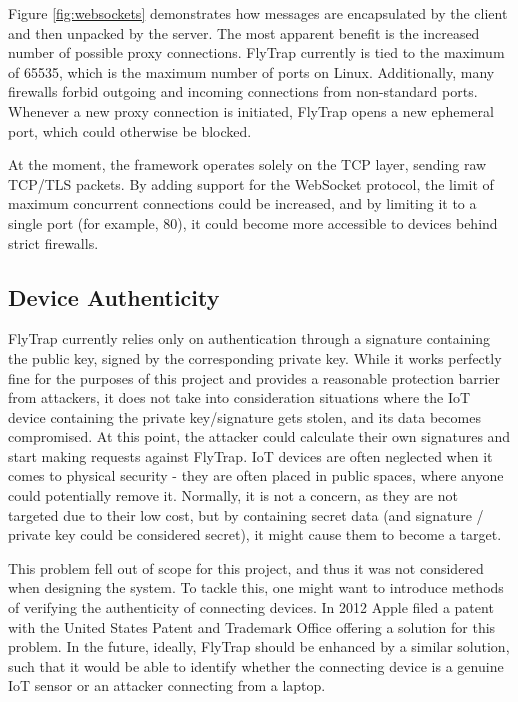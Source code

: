 Figure \ref{fig:websockets} demonstrates how messages are encapsulated by the client and then unpacked by the server. The most apparent benefit is the increased number of possible proxy connections. FlyTrap currently is tied to the maximum of 65535, which is the maximum number of ports on Linux. Additionally, many firewalls forbid outgoing and incoming connections from non-standard ports. Whenever a new proxy connection is initiated, FlyTrap opens a new ephemeral port, which could otherwise be blocked.

At the moment, the framework operates solely on the TCP layer, sending raw TCP/TLS packets. By adding support for the WebSocket protocol, the limit of maximum concurrent connections could be increased, and by limiting it to a single port (for example, 80), it could become more accessible to devices behind strict firewalls.
\subsection{Device Authenticity}
FlyTrap currently relies only on authentication through a signature containing the public key, signed by the corresponding private key. While it works perfectly fine for the purposes of this project and provides a reasonable protection barrier from attackers, it does not take into consideration situations where the IoT device containing the private key/signature gets stolen, and its data becomes compromised. At this point, the attacker could calculate their own signatures and start making requests against FlyTrap. IoT devices are often neglected when it comes to physical security - they are often placed in public spaces, where anyone could potentially remove it. Normally, it is not a concern, as they are not targeted due to their low cost, but by containing secret data (and signature / private key could be considered secret), it might cause them to become a target.

This problem fell out of scope for this project, and thus it was not considered when designing the system. To tackle this, one might want to introduce methods of verifying the authenticity of connecting devices. In 2012 Apple filed a patent with the United States Patent and Trademark Office \cite{omernick2012systems} offering a solution for this problem. In the future, ideally, FlyTrap should be enhanced by a similar solution, such that it would be able to identify whether the connecting device is a genuine IoT sensor or an attacker connecting from a laptop.

